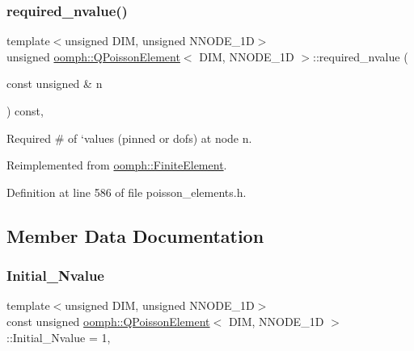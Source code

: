 \subsubsection{\texorpdfstring{required\+\_\+nvalue()}{required\_nvalue()}}
{\footnotesize\ttfamily template$<$unsigned D\+IM, unsigned N\+N\+O\+D\+E\+\_\+1D$>$ \\
unsigned \hyperlink{classoomph_1_1QPoissonElement}{oomph\+::\+Q\+Poisson\+Element}$<$ D\+IM, N\+N\+O\+D\+E\+\_\+1D $>$\+::required\+\_\+nvalue (\begin{DoxyParamCaption}\item[{const unsigned \&}]{n }\end{DoxyParamCaption}) const\hspace{0.3cm}{\ttfamily [inline]}, {\ttfamily [virtual]}}



Required \# of `values\textquotesingle{} (pinned or dofs) at node n. 



Reimplemented from \hyperlink{classoomph_1_1FiniteElement_a56610c60d5bc2d7c27407a1455471b1a}{oomph\+::\+Finite\+Element}.



Definition at line 586 of file poisson\+\_\+elements.\+h.



\subsection{Member Data Documentation}
\mbox{\label{classoomph_1_1QPoissonElement_ae70e89737e1030ac25fff6b9e6ea7017}} 
\subsubsection{\texorpdfstring{Initial\+\_\+\+Nvalue}{Initial\_Nvalue}}
{\footnotesize\ttfamily template$<$unsigned D\+IM, unsigned N\+N\+O\+D\+E\+\_\+1D$>$ \\
const unsigned \hyperlink{classoomph_1_1QPoissonElement}{oomph\+::\+Q\+Poisson\+Element}$<$ D\+IM, N\+N\+O\+D\+E\+\_\+1D $>$\+::Initial\+\_\+\+Nvalue = 1\hspace{0.3cm}{\ttfamily [static]}, {\ttfamily [private]}}



